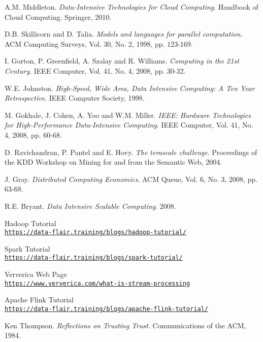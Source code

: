 \begin{thebibliography}{9}

A.M. Middleton.
\textit{Data-Intensive Technologies for Cloud Computing}. 
Handbook of Cloud Computing. Springer, 2010.

D.B. Skillicorn and D. Talia.
\textit{Models and languages for parallel computation}. 
ACM Computing Surveys, Vol. 30, No. 2, 1998, pp. 123-169.

I. Gorton, P. Greenfield, A. Szalay and R. Williams.
\textit{Computing in the 21st Century}. 
IEEE Computer, Vol. 41, No. 4, 2008, pp. 30-32.

W.E. Johnston.
\textit{High-Speed, Wide Area, Data Intensive Computing: A Ten Year Retrospective}. 
IEEE Computer Society, 1998.

M. Gokhale, J. Cohen, A. Yoo and W.M. Miller.
\textit{IEEE: Hardware Technologies for High-Performance Data-Intensive Computing}. 
IEEE Computer, Vol. 41, No. 4, 2008, pp. 60-68.

D. Ravichandran, P. Pantel and E. Hovy.
\textit{The terascale challenge}. 
Proceedings of the KDD Workshop on Mining for and from the Semantic Web, 2004.

J. Gray.
\textit{Distributed Computing Economics}. 
ACM Queue, Vol. 6, No. 3, 2008, pp. 63-68.

R.E. Bryant.
\textit{Data Intensive Scalable Computing}. 
2008.

Hadoop Tutorial
\\\texttt{\url{https://data-flair.training/blogs/hadoop-tutorial/}}

Spark Tutorial
\\\texttt{\url{https://data-flair.training/blogs/spark-tutorial/}}

Ververica Web Page
\\\texttt{\url{https://www.ververica.com/what-is-stream-processing}}

Apache Flink Tutorial
\\\texttt{\url{https://data-flair.training/blogs/apache-flink-tutorial/}}

Ken Thompson.
\textit{Reflections on Trusting Trust}. 
Communications of the ACM, 1984.


\end{thebibliography}

